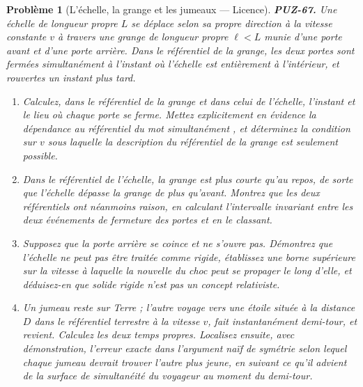 \documentclass[11pt]{article}
\newtheorem{problem}{Problème}
\begin{document}
\begin{problem}[{L'échelle, la grange et les jumeaux --- Licence}]
\textbf{PUZ-67.} Une échelle de longueur propre $ L $ se déplace selon sa propre
direction à la vitesse constante $ v $ à travers une grange de longueur propre
$ \ell < L $ munie d'une porte avant et d'une porte arrière. Dans le référentiel de la
grange, les deux portes sont fermées simultanément à l'instant où l'échelle est entièrement
à l'intérieur, et rouvertes un instant plus tard.
\begin{enumerate}
\item[(a)] Calculez, dans le référentiel de la grange et dans celui de l'échelle, l'instant et le
lieu où chaque porte se ferme. Mettez explicitement en évidence la dépendance au référentiel
du mot \og{} simultanément \fg{}, et déterminez la condition sur $ v $ sous laquelle la description
du référentiel de la grange est seulement possible.
\item[(b)] Dans le référentiel de l'échelle, la grange est plus courte qu'au repos, de sorte que
l'échelle dépasse la grange de plus qu'avant. Montrez que les deux référentiels ont
néanmoins raison, en calculant l'intervalle invariant entre les deux événements de fermeture
des portes et en le classant.
\item[(c)] Supposez que la porte arrière se coince et ne s'ouvre pas. Démontrez que l'échelle ne
peut pas être traitée comme rigide, établissez une borne supérieure sur la vitesse à
laquelle la nouvelle du choc peut se propager le long d'elle, et déduisez-en que \og{} solide
rigide \fg{} n'est pas un concept relativiste.
\item[(d)] Un jumeau reste sur Terre ; l'autre voyage vers une étoile située à la distance $ D $
dans le référentiel terrestre à la vitesse $ v $, fait instantanément demi-tour, et
revient. Calculez les deux temps propres. Localisez ensuite, avec démonstration, l'erreur
exacte dans l'argument naïf de symétrie selon lequel chaque jumeau devrait trouver l'autre
plus jeune, en suivant ce qu'il advient de la surface de simultanéité du voyageur au moment
du demi-tour.
\end{enumerate}

\end{problem}
\end{document}
